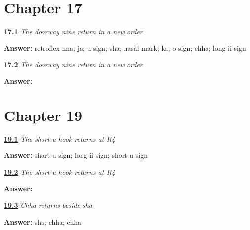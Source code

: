 \section*{Chapter 17}

\noindent\begin{minipage}[t]{\linewidth}
\raggedright
\hyperlink{review-GU-R13-doorway-nine-r3-reading}{\textbf{17.1}} \emph{The doorway nine return in a new order}\par
\small \textbf{Answer:} retroflex nna; ja; u sign; sha; nasal mark; ka; o sign; chha; long-ii sign\par
\end{minipage}\par\medskip

\noindent\begin{minipage}[t]{\linewidth}
\raggedright
\hyperlink{review-GU-R13-doorway-nine-r3-dictation}{\textbf{17.2}} \emph{The doorway nine return in a new order}\par
\small \textbf{Answer:}         \par
\end{minipage}\par\medskip

\section*{Chapter 19}

\noindent\begin{minipage}[t]{\linewidth}
\raggedright
\hyperlink{review-GU-R15-u-matra-r4-reading}{\textbf{19.1}} \emph{The short-u hook returns at R4}\par
\small \textbf{Answer:} short-u sign; long-ii sign; short-u sign\par
\end{minipage}\par\medskip

\noindent\begin{minipage}[t]{\linewidth}
\raggedright
\hyperlink{review-GU-R15-u-matra-r4-dictation}{\textbf{19.2}} \emph{The short-u hook returns at R4}\par
\small \textbf{Answer:}   \par
\end{minipage}\par\medskip

\noindent\begin{minipage}[t]{\linewidth}
\raggedright
\hyperlink{review-GU-R15-chha-r4-reading}{\textbf{19.3}} \emph{Chha returns beside sha}\par
\small \textbf{Answer:} sha; chha; chha\par
\end{minipage}\par\medskip

